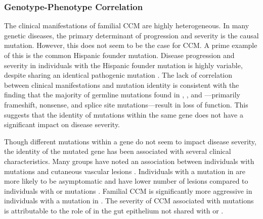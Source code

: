 \subsubsection{Genotype-Phenotype Correlation}
The clinical manifestations of familial CCM are highly heterogeneous. In many genetic diseases, the primary determinant of progression and severity is the causal mutation. However, this does not seem to be the case for CCM. A prime example of this is the common Hispanic founder mutation. Disease progression and severity in individuals with the Hispanic founder mutation is highly variable, despite sharing an identical pathogenic mutation \citep{gault2006, laurans2003, denier2004, gianfrancesco2007}. The lack of correlation between clinical manifestations and mutation identity is consistent with the finding that the majority of germline mutations found in , , and ---primarily frameshift, nonsense, and splice site mutations---result in loss of function. This suggests that the identity of mutations within the same gene does not have a significant impact on disease severity.

Though different mutations within a gene do not seem to impact disease severity, the identity of the mutated gene has been associated with several clinical characteristics. Many groups have noted an association between individuals with  mutations and cutaneous vascular lesions \citep{gianfrancesco2007, sirvente2009, musunuru2003, grippaudo2013, wang2013, eerola2000, labauge1999}. Individuals with a mutation in  are more likely to be asymptomatic and have lower number of lesions compared to individuals with  or  mutations \citep{denier2006}. Familial CCM is significantly more aggressive in individuals with a mutation in  \citep{fauth2015, shenkar2015, riant2013}. The severity of CCM associated with  mutations is attributable to the role of  in the gut epithelium not shared with  or  \citep{tang2019}. 

